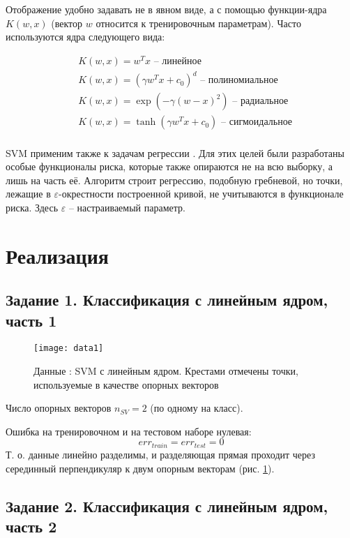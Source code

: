 \documentclass[a4paper,12pt]{article} %
\newcommand{\myPictWidth}{.95\textwidth}
\begin{document}
Отображение удобно задавать не в явном виде, а с помощью функции-ядра $K(w, x) $ (вектор $ w $ относится к тренировочным параметрам). Часто используются ядра следующего вида:

\begin{align*}
    & K(w, x) = w^Tx \text{ -- линейное} \\ %
    & K(w, x) = (\gamma w^Tx + c_0)^d \text{ -- полиномиальное} \\
    & K(w, x) = \exp(-\gamma (w-x)^2) \text{ -- радиальное} \\
    & K(w, x) = \tanh(\gamma w^Tx + c_0) \text{ -- сигмоидальное} \\
\end{align*}

SVM применим также к задачам регрессии \cite{vapnik}.
Для этих целей были разработаны особые функционалы риска, которые также опираются не на всю выборку, а лишь на часть её.
Алгоритм строит регрессию, подобную гребневой, но точки, лежащие в $\varepsilon$-окрестности построенной кривой, не учитываются в функционале риска. Здесь $\varepsilon$ -- настраиваемый параметр.

\newpage
\section{Реализация}
\subsection{Задание 1. Классификация с линейным ядром, часть 1}

\begin{figure}[H]
    \centering \texttt{[image: data1]}
    \caption{Данные : SVM с линейным ядром. Крестами отмечены точки, используемые в качестве опорных векторов }
    \label{fig:data1}
\end{figure}

Число опорных векторов $ n_{SV} = 2 $ (по одному на класс).

Ошибка на тренировочном и на тестовом наборе нулевая:
$$ err_{train} = err_{test} = 0 $$
Т. о. данные линейно разделимы, и разделяющая прямая проходит через серединный перпендикуляр к двум опорным векторам (рис. \ref{fig:data1}).

\subsection{Задание 2. Классификация с линейным ядром, часть 2}\label{section:task2}
\end{document}
